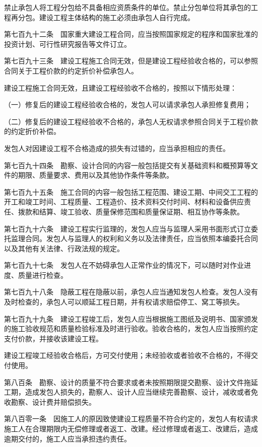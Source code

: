 \documentclass[UTF8,12pt,a4paper]{ctexbook}
\begin{document}
禁止承包人将工程分包给不具备相应资质条件的单位。禁止分包单位将其承包的工程再分包。建设工程主体结构的施工必须由承包人自行完成。

第七百九十二条　国家重大建设工程合同，应当按照国家规定的程序和国家批准的投资计划、可行性研究报告等文件订立。

第七百九十三条　建设工程施工合同无效，但是建设工程经验收合格的，可以参照合同关于工程价款的约定折价补偿承包人。

建设工程施工合同无效，且建设工程经验收不合格的，按照以下情形处理：

（一）修复后的建设工程经验收合格的，发包人可以请求承包人承担修复费用；

（二）修复后的建设工程经验收不合格的，承包人无权请求参照合同关于工程价款的约定折价补偿。

发包人对因建设工程不合格造成的损失有过错的，应当承担相应的责任。

第七百九十四条　勘察、设计合同的内容一般包括提交有关基础资料和概预算等文件的期限、质量要求、费用以及其他协作条件等条款。

第七百九十五条　施工合同的内容一般包括工程范围、建设工期、中间交工工程的开工和竣工时间、工程质量、工程造价、技术资料交付时间、材料和设备供应责任、拨款和结算、竣工验收、质量保修范围和质量保证期、相互协作等条款。

第七百九十六条　建设工程实行监理的，发包人应当与监理人采用书面形式订立委托监理合同。发包人与监理人的权利和义务以及法律责任，应当依照本编委托合同以及其他有关法律、行政法规的规定。

第七百九十七条　发包人在不妨碍承包人正常作业的情况下，可以随时对作业进度、质量进行检查。

第七百九十八条　隐蔽工程在隐蔽以前，承包人应当通知发包人检查。发包人没有及时检查的，承包人可以顺延工程日期，并有权请求赔偿停工、窝工等损失。

第七百九十九条　建设工程竣工后，发包人应当根据施工图纸及说明书、国家颁发的施工验收规范和质量检验标准及时进行验收。验收合格的，发包人应当按照约定支付价款，并接收该建设工程。

建设工程竣工经验收合格后，方可交付使用；未经验收或者验收不合格的，不得交付使用。

第八百条　勘察、设计的质量不符合要求或者未按照期限提交勘察、设计文件拖延工期，造成发包人损失的，勘察人、设计人应当继续完善勘察、设计，减收或者免收勘察、设计费并赔偿损失。

第八百零一条　因施工人的原因致使建设工程质量不符合约定的，发包人有权请求施工人在合理期限内无偿修理或者返工、改建。经过修理或者返工、改建后，造成逾期交付的，施工人应当承担违约责任。
\end{document}
